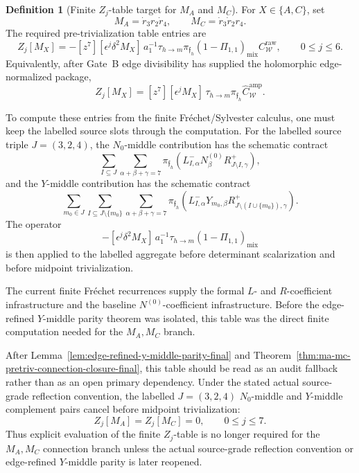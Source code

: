 \documentclass[11pt,a4paper]{amsart}
\theoremstyle{plain}
\theoremstyle{definition}
\newtheorem{definition}[theorem]{Definition}
\begin{document}
\begin{definition}[Finite \(Z_j\)-table target for \(M_A\) and \(M_C\)]
\label{def:finite-zj-table-target-ma-mc}
For \(X\in\{A,C\}\), set
\[
M_A=\dot r_3r_2\dot r_4,
\qquad
M_C=\dot r_3\dot r_2r_4.
\]
The required pre-trivialization table entries are
\[
Z_j[M_X]
=
-[z^7][\epsilon^j\delta^2M_X]\,
a_1^{-1}\tau_{h\to m}
\pi_{\mathfrak f_h}
(1-\Pi_{1,1})_{\mathrm{mix}}C_{\mathcal W}^{\mathrm{raw}},
\qquad
0\le j\le6.
\]
Equivalently, after Gate~B edge divisibility has supplied the holomorphic
edge-normalized package,
\[
Z_j[M_X]
=
[z^7][\epsilon^jM_X]\,
\tau_{h\to m}\pi_{\mathfrak f_h}
\widehat C_{\mathcal W}^{\mathrm{amp}}.
\]

To compute these entries from the finite Fr\'echet/Sylvester calculus, one
must keep the labelled source slots through the computation.  For the
labelled source triple \(J=(3,2,4)\), the \(N_0\)-middle contribution has
the schematic contract
\[
\sum_{I\subseteq J}
\sum_{\alpha+\beta+\gamma=7}
\pi_{\mathfrak f_h}
\left(
L^-_{I,\alpha}N^{(0)}_{\beta}
R^+_{J\setminus I,\gamma}
\right),
\]
and the \(Y\)-middle contribution has the schematic contract
\[
\sum_{m_0\in J}
\sum_{I\subseteq J\setminus\{m_0\}}
\sum_{\alpha+\beta+\gamma=7}
\pi_{\mathfrak f_h}
\left(
L^-_{I,\alpha}Y_{m_0,\beta}
R^+_{J\setminus(I\cup\{m_0\}),\gamma}
\right).
\]
The operator
\[
-[\epsilon^j\delta^2M_X]\,a_1^{-1}\tau_{h\to m}
(1-\Pi_{1,1})_{\mathrm{mix}}
\]
is then applied to the labelled aggregate before determinant scalarization
and before midpoint trivialization.

The current finite Fr\'echet recurrences supply the formal \(L\)- and
\(R\)-coefficient infrastructure and the baseline \(N^{(0)}\)-coefficient
infrastructure.  Before the edge-refined \(Y\)-middle parity theorem was
isolated, this table was the direct finite computation needed for the
\(M_A,M_C\) branch.

After Lemma~\ref{lem:edge-refined-y-middle-parity-final} and
Theorem~\ref{thm:ma-mc-pretriv-connection-closure-final}, this table should
be read as an audit fallback rather than as an open primary dependency.  Under
the stated actual source-grade reflection convention, the labelled
\(J=(3,2,4)\) \(N_0\)-middle and \(Y\)-middle complement pairs cancel
before midpoint trivialization:
\[
Z_j[M_A]=Z_j[M_C]=0,\qquad 0\le j\le7.
\]
Thus explicit evaluation of the finite \(Z_j\)-table is no longer required
for the \(M_A,M_C\) connection branch unless the actual source-grade
reflection convention or edge-refined \(Y\)-middle parity is later reopened.
\end{definition}
\end{document}
